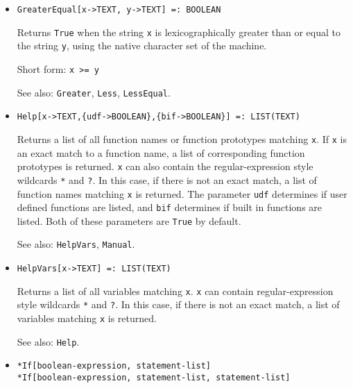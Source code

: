 \begin{itemize}
\item
\protect \large \begin{verbatim}
GreaterEqual[x->TEXT, y->TEXT] =: BOOLEAN
\end{verbatim}\normalsize

\bd
Returns \verb+True+ when the string \verb+x+ is lexicographically greater than
or equal to the string \verb+y+, using the native character set of the
machine.
\item
[Short form:] \verb+x >= y+
\item
[See also:] {\tt Greater}, {\tt Less}, {\tt LessEqual}.
\ed



\item
\protect \large \begin{verbatim}
Help[x->TEXT,{udf->BOOLEAN},{bif->BOOLEAN}] =: LIST(TEXT)
\end{verbatim}\normalsize

\bd 
Returns a list of all function names or function prototypes
matching \verb+x+.  If \verb+x+ is an exact match to a function name,
a list of corresponding function prototypes is returned.  \verb+x+ can
also contain the regular-expression style wildcards
\verb+*+ and \verb+?+.  In this
case, if there is not an exact match, a list of function names
matching \verb+x+ is returned.  The parameter \verb+udf+ determines if
user defined functions are listed, and \verb+bif+ determines if built
in functions are listed.  Both of these parameters are \verb+True+ by
default. 
\item
[See also:] \verb+HelpVars+, \verb+Manual+.
\ed

\item
\protect \large \begin{verbatim}
HelpVars[x->TEXT] =: LIST(TEXT)
\end{verbatim}\normalsize

\bd 
Returns a list of all variables matching \verb+x+.  \verb+x+ can
contain regular-expression style wildcards \verb+*+ and \verb+?+. 
In this case,
if there is not an exact match, a list of variables matching \verb+x+
is returned.
\item [See also:] \verb+Help+.
\ed


\item 
\protect \large \begin{verbatim}
*If[boolean-expression, statement-list]
*If[boolean-expression, statement-list, statement-list]
\end{verbatim} \normalsize
  

\end{itemize}
